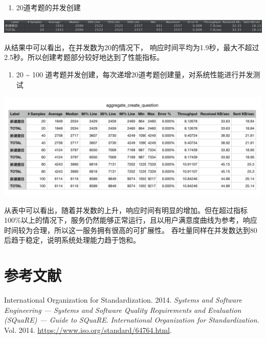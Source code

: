 \documentclass[hyperref, a4paper]{ctexart}
\providecommand{\tightlist}{%
  \setlength{\itemsep}{0pt}\setlength{\parskip}{0pt}}
\begin{document}
\begin{enumerate}
\def\labelenumi{\arabic{enumi}.}
\tightlist
\item
  20道考题的并发创建
\end{enumerate}

\includegraphics{resources/wcn/create_question_20.png}

从结果中可以看出，在并发数为20的情况下，
响应时间平均为1.9秒，最大不超过2.5秒。所以创建考题部分较好地达到了性能指标。

\begin{enumerate}
\def\labelenumi{\arabic{enumi}.}
\setcounter{enumi}{1}
\tightlist
\item
  20 \textasciitilde{} 100
  道考题并发创建，每次递增20道考题创建量，对系统性能进行并发测试
\end{enumerate}

\includegraphics{resources/wcn/create_question_aggregate.png}

从表中可以看出，随着并发数的上升，响应时间有明显的增加。但在超过指标100\%以上的情况下，服务仍然能够正常运行，且以用户满意度曲线为参考，响应时间较为合理，所以这一服务拥有很高的可扩展性。
吞吐量同样在并发数达到80后趋于稳定，说明系统处理能力趋于饱和。

\pagebreak

\hypertarget{ux53c2ux8003ux6587ux732e}{%
\section*{参考文献}\label{ux53c2ux8003ux6587ux732e}}

\hypertarget{refs}{}
\leavevmode\hypertarget{ref-innovativeInternationalisation}{}%
International Organization for Standardization. 2014. \emph{Systems and
Software Engineering --- Systems and Software Quality Requirements and
Evaluation (SQuaRE) --- Guide to SQuaRE}. \emph{International
Organization for Standardization}. Vol. 2014.
\url{https://www.iso.org/standard/64764.html}.
\end{document}
